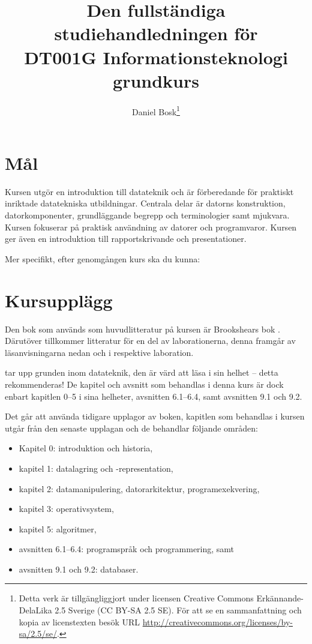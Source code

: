 \documentclass[a4paper,logo]{miunart}
\title{Den fullständiga studiehandledningen för\\
  DT001G Informationsteknologi grundkurs}
\author{
  Daniel Bosk\footnote{%
    Detta verk är tillgängliggjort under licensen Creative Commons 
    Erkännande-DelaLika 2.5 Sverige (CC BY-SA 2.5 SE).
    För att se en sammanfattning och kopia av licenstexten besök URL 
    \url{http://creativecommons.org/licenses/by-sa/2.5/se/}.
  }
}
\date{\svnId}
\begin{document}
\maketitle
\tableofcontents


\section{Mål}
\label{sec:aim}
Kursen utgör en introduktion till datateknik och är förberedande för praktiskt 
inriktade datatekniska utbildningar.
Centrala delar är datorns konstruktion, datorkomponenter, grundläggande begrepp 
och terminologier samt mjukvara.
Kursen fokuserar på praktisk användning av datorer och programvaror.
Kursen ger även en introduktion till rapportskrivande och presentationer.

Mer specifikt, efter genomgången kurs ska du kunna:
\begin{itemize}
  
  
  
  
  
\end{itemize}


\section{Kursupplägg}
\label{sec:outline}
Den bok som används som huvudlitteratur på kursen är Brookshears bok 
 \cite{Brookshear2012csa}.
Därutöver tillkommer litteratur för en del av laborationerna, denna framgår av 
läsanvisningarna nedan och i respektive laboration.

\citet{Brookshear2012csa} tar upp grunden inom datateknik, den är värd att läsa 
i sin helhet -- detta rekommenderas!
De kapitel och avsnitt som behandlas i denna kurs är dock enbart kapitlen 0--5 
i sina helheter, avsnitten 6.1--6.4, samt avsnitten 9.1 och 9.2.

Det går att använda tidigare upplagor av boken, kapitlen som behandlas i kursen 
utgår från den senaste upplagan \citep{Brookshear2012csa} och de behandlar 
följande områden:
\begin{itemize}
	\item Kapitel 0: introduktion och historia,
	\item kapitel 1: datalagring och -representation,
	\item kapitel 2: datamanipulering, datorarkitektur, programexekvering,
	\item kapitel 3: operativsystem,
  \item kapitel 5: algoritmer,
  \item avsnitten 6.1--6.4: programspråk och programmering, samt
  \item avsnitten 9.1 och 9.2: databaser.
\end{itemize}
\end{document}
